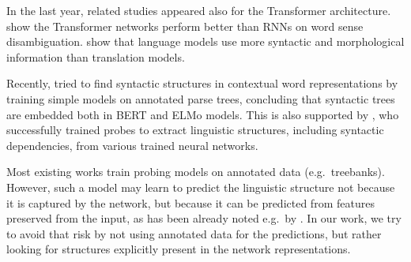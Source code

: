\documentclass[11pt,a4paper]{article}
\def\RR#1{{\color{blue}RR: \it #1}}
\def\DM#1{{\color{red}DM: \it #1}}
\def\RR#1{}
\def\DM#1{}
\begin{document}
In the last year, related studies appeared also for the Transformer architecture.
\citet{tang:2018} show the Transformer networks perform better than RNNs on
word sense disambiguation.
\citet{zhang:2018} show that language models use more syntactic and morphological information than translation models.



Recently, \citet{hewitt:2019} tried to find syntactic structures in contextual word representations by training simple models on annotated parse trees, concluding that syntactic trees are embedded both in BERT \citep{bert} and ELMo \citep{elmo} models.
This is also supported by \citet{belinkov:2019}, who successfully trained probes to extract linguistic structures, including syntactic dependencies, from various trained neural networks.

Most existing works train probing models on annotated data (e.g.\ treebanks).
However, such a model may learn
to predict the linguistic structure not because it is captured by the network, but because it can be predicted from features
preserved from the input,
as has been already noted e.g.\ by \citet{belinkov:survey}.
In our work, we try to avoid that risk by not using annotated data for the predictions, but rather looking for structures explicitly present in the network representations.


\end{document}
